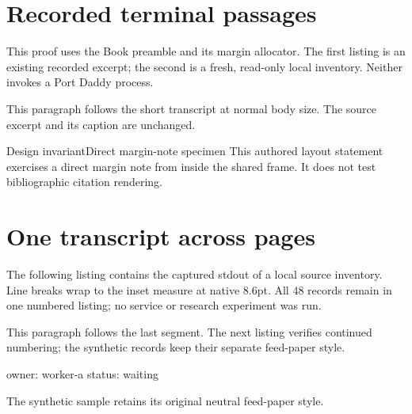 \documentclass[11pt,twoside]{article}
\begin{document}
\pagestyle{plain}
\section{Recorded terminal passages}
This proof uses the Book preamble and its margin allocator. The first listing
is an existing recorded excerpt; the second is a fresh, read-only local
inventory. Neither invokes a Port Daddy process.

This paragraph follows the short transcript at normal body size. The source
excerpt and its caption are unchanged.
\begin{pdclaim}{Design invariant}{Direct margin-note specimen}
This authored layout statement exercises a direct margin note from inside
the shared frame. It does not test bibliographic citation rendering.
\end{pdclaim}
\section{One transcript across pages}
The following listing contains the captured stdout of a local source inventory.
Line breaks wrap to the inset measure at native 8.6pt. All 48 records remain
in one numbered listing; no service or research experiment was run.

This paragraph follows the last segment. The next listing verifies continued
numbering; the synthetic records keep their separate feed-paper style.

\begin{pdsampledata}
owner: worker-a
status: waiting
\end{pdsampledata}
The synthetic sample retains its original neutral feed-paper style.
\end{document}
